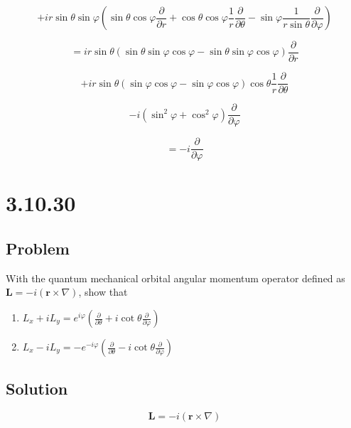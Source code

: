 \documentclass[12pt]{article}
\begin{document}
\[
    + i r \sin{\theta} \sin{\varphi}
    \left(
    \sin{\theta} \cos{\varphi} \frac{\partial}{\partial r}
    + \cos{\theta} \cos{\varphi} \frac{1}{r} \frac{\partial}{\partial \theta}
    - \sin{\varphi} \frac{1}{r \sin{\theta}} \frac{\partial}{\partial \varphi}
    \right)
\]

\[
    = i r \sin{\theta}
    \left(\sin{\theta} \sin{\varphi} \cos{\varphi} - \sin{\theta} \sin{\varphi} \cos{\varphi} \right)
    \frac{\partial}{\partial r}
\]

\[
    + i r \sin{\theta}
    \left(\sin{\varphi} \cos{\varphi} - \sin{\varphi} \cos{\varphi}\right)
    \cos{\theta} \frac{1}{r} \frac{\partial}{\partial \theta}
\]

\[
    - i \left(\sin^2{\varphi} + \cos^2{\varphi} \right) \frac{\partial}{\partial \varphi}
\]

\[
    = - i \frac{\partial}{\partial \varphi}
\]

\section{3.10.30}

\subsection{Problem}

With the quantum mechanical orbital angular momentum operator defined as
\(\textbf{L} = -i \left(\textbf{r} \times \nabla\right)\), show that
\bigskip

\begin{enumerate}[label= \textbf{(\alph*)}]
    \item
          \(
          L_x + i L_y = e^{i \varphi}
          \left(
          \frac{\partial}{\partial \theta}
          + i \cot{\theta}\frac{\partial}{\partial \varphi}
          \right)
          \)

    \item
          \(
          L_x - i L_y = - e^{- i \varphi}
          \left(
          \frac{\partial}{\partial \theta}
          - i \cot{\theta}\frac{\partial}{\partial \varphi}
          \right)
          \)
\end{enumerate}
\bigskip

\subsection{Solution}

\[
    \textbf{L} = -i \left(\textbf{r} \times \nabla\right)
\]
\end{document}
